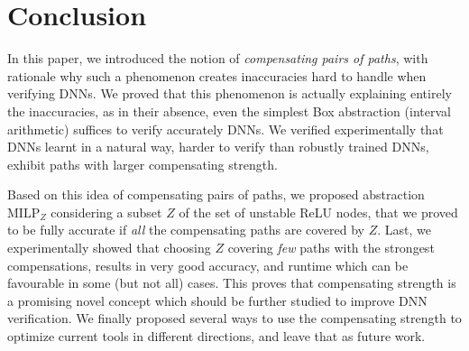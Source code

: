 \documentclass{llncs}
\newcommand{\MILP}{{\textrm{MILP}}}
\begin{document}
\section{Conclusion}
\vspace{-0.2cm}

In this paper, we introduced the notion of {\em compensating pairs of paths}, with rationale why such a phenomenon creates inaccuracies hard to handle when verifying DNNs. We proved that this phenomenon is actually explaining entirely the inaccuracies, as in their absence, even the simplest Box abstraction (interval arithmetic) suffices to verify accurately DNNs. We verified experimentally that DNNs learnt in a natural way, harder to verify than robustly trained DNNs, exhibit paths with larger compensating strength. 

Based on this idea of compensating pairs of paths, we proposed abstraction $\MILP_{Z}$ considering a subset $Z$ of the set of unstable ReLU nodes, that we proved to be fully accurate if {\em all} the compensating paths are covered by $Z$. Last, we experimentally showed that choosing $Z$ covering {\em few} paths with the strongest compensations, results in very good accuracy, and runtime which can be favourable in some (but not all) cases. This proves that compensating strength is a promising novel concept which should be further studied to improve DNN verification. We finally proposed several ways to use the compensating strength to optimize current tools in different directions, and leave that as future work.

\newpage




\newpage

\appendix


\end{document}
